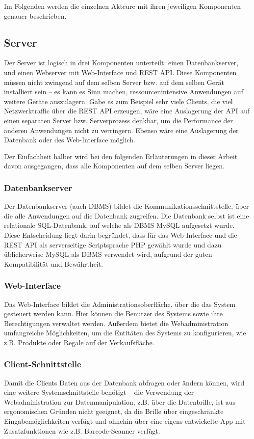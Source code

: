 Im Folgenden werden die einzelnen Akteure mit ihren jeweiligen Komponenten genauer beschrieben.

\subsection{Server}

Der Server ist logisch in drei Komponenten unterteilt: einen Datenbankserver, und einen Webserver mit Web-Interface und \ac{REST} \ac{API}. Diese Komponenten müssen nicht zwingend auf dem selben Server bzw. auf dem selben Gerät installiert sein -- es kann es Sinn machen, ressourcenintensive Anwendungen auf weitere Geräte auszulagern. Gäbe es zum Beispiel sehr viele Clients, die viel Netzwerktraffic über die REST API erzeugen, wäre eine Auslagerung der API auf einen separaten Server bzw. Serverprozess denkbar, um die Performance der anderen Anwendungen nicht zu verringern. Ebenso wäre eine Auslagerung der Datenbank oder des Web-Interface möglich.

Der Einfachheit halber wird bei den folgenden Erläuterungen in dieser Arbeit davon ausgegangen, dass alle Komponenten auf dem selben Server liegen.

\subsubsection{Datenbankserver}
Der Datenbankserver (auch \ac{DBMS}) bildet die Kommunikationsschnittstelle, über die alle Anwendungen auf die Datenbank zugreifen. Die Datenbank selbst ist eine relationale \ac{SQL}-Datenbank, auf welche als \ac{DBMS} MySQL aufgesetzt wurde. Diese Entscheidung liegt darin begründet, dass für das Web-Interface und die REST API als serverseitige Scriptsprache \ac{PHP} gewählt wurde und dazu üblicherweise MySQL als DBMS verwendet wird, aufgrund der guten Kompatibilität und Bewährtheit.

\subsubsection{Web-Interface}
Das Web-Interface bildet die Administrationsoberfläche, über die das System gesteuert werden kann. Hier können die Benutzer des Systems sowie ihre Berechtigungen verwaltet werden. Außerdem bietet die Webadministration umfangreiche Möglichkeiten, um die Entitäten des Systems zu konfigurieren, wie z.B. Produkte oder Regale auf der Verkaufsfläche.

\subsubsection{Client-Schnittstelle}
Damit die Clients Daten aus der Datenbank abfragen oder ändern können, wird eine weitere Systemschnittstelle benötigt -- die Verwendung der Webadministration zur Datenmanipulation, z.B. über die Datenbrille, ist aus ergonomischen Gründen nicht geeignet, da die Brille über eingeschränkte Eingabemöglichkeiten verfügt und ohnehin über eine eigens entwickelte App mit Zusatzfunktionen wie z.B. Barcode-Scanner verfügt.

